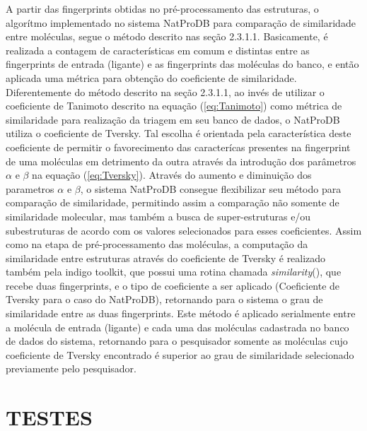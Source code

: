 A partir das fingerprints obtidas no pré-processamento das estruturas, o algorítmo implementado no sistema NatProDB para comparação de similaridade entre moléculas, segue o método descrito nas seção 2.3.1.1. Basicamente, é realizada a contagem de características em comum e distintas entre as fingerprints de entrada (ligante) e as fingerprints das moléculas do banco, e então aplicada uma métrica para obtenção do coeficiente de similaridade. Diferentemente do método descrito na seção 2.3.1.1, ao invés de utilizar o coeficiente de Tanimoto  descrito na equação (\ref{eq:Tanimoto}) como métrica de similaridade para realização da triagem em seu banco de dados, o NatProDB utiliza o coeficiente de Tversky. Tal escolha é orientada pela característica deste coeficiente de permitir o favorecimento das caracterícas presentes na fingerprint de uma moléculas em detrimento da outra através da introdução dos parâmetros $\alpha$ e $\beta$ na equação (\ref{eq:Tversky}). Através do aumento e diminuição dos parametros $\alpha$ e $\beta$, o sistema NatProDB consegue flexibilizar seu método para comparação de similaridade, permitindo assim a comparação não somente de similaridade molecular, mas também a busca de super-estruturas e/ou subestruturas de acordo com os valores selecionados para esses coeficientes. Assim como na etapa de pré-processamento das moléculas, a computação da similaridade entre estruturas através do coeficiente de Tversky é realizado também pela indigo toolkit, que possui uma rotina chamada \textit{similarity}(), que recebe duas fingerprints, e o tipo de coeficiente a ser aplicado (Coeficiente de Tversky para o caso do NatProDB), retornando para o sistema o grau de similaridade entre as duas fingerprints. Este método é aplicado serialmente entre a molécula de entrada (ligante) e cada uma das moléculas cadastrada no banco de dados do sistema, retornando para o pesquisador somente as moléculas cujo coeficiente de Tversky encontrado é superior ao grau de similaridade selecionado previamente pelo pesquisador.  

\section{TESTES}

